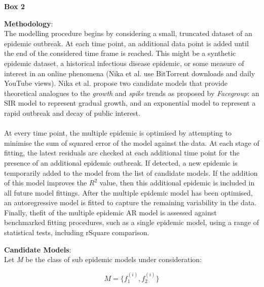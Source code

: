 \begin{framed}
{\begin{center}{\bf Box 2}\end{center}}
{\bf Methodology}:\\
The modelling procedure begins by considering a small, truncated
dataset of an epidemic outbreak. At each time point, an additional
data point is added until the end of the considered time frame is
reached. This might be a synthetic epidemic dataset, a historical
infectious disease epidemic, or some measure of interest in an online
phenomena (Nika et al. use BitTorrent downloads and daily YouTube
views). Nika et al. propose two candidate models that provide
theoretical analogues to the \emph{growth} and \emph{spike} trends as
proposed by \emph{Facegroup}: an SIR model to represent gradual
growth, and an exponential model to represent a rapid outbreak and
decay of public interest.\cite{facegroup}\\\\

At every time point, the multiple epidemic is optimised by attempting
to minimise the sum of squared error of the model against the data. At
each stage of fitting, the latest residuals are checked at each
additional time point for the presence of an additional epidemic
outbreak. If detected, a new epidemic is temporarily added to the
model from the list of candidate models. If the addition of this model
improves the $R^2$ value, then this additional epidemic is included in
all future model fittings. After the multiple epidemic model has been
optimised, an autoregressive model is fitted to capture the remaining
variability in the data. Finally, thefit of the multiple epidemic AR
model is assessed against benchmarked fitting procedures, such as a
single epidemic model, using a range of statistical tests, including
rSquare comparison.

{\bf Candidate Models}:\\
Let \emph{M} be the class of sub epidemic models under consideration: 

 \begin{equation*} M  = \{f_{1}^{(i)}, f_{2}^{(i)}\} \end{equation*}


\end{framed}
